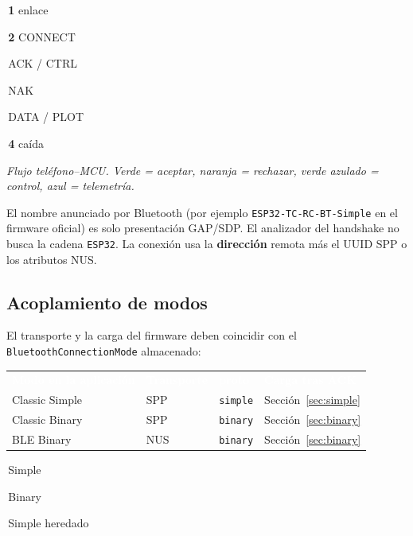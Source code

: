 \documentclass[12pt,a4paper]{article}
\newcommand{\thc}[1]{\textcolor{white}{\bfseries #1}}
\newcommand{\chip}[2]{\colorbox{#1}{\strut\,\scriptsize #2\,}}
\begin{document}
\begin{center}

\vspace{0.3em}
{\sffamily\scriptsize
\chip{TblHead!18}{\textcolor{TblHead}{\textbf{1} enlace}}
\chip{TblSync}{\textbf{2} CONNECT}
\chip{TblChan}{ACK / CTRL}
\chip{TblId}{NAK}
\chip{TblTelem}{DATA / PLOT}
\chip{TblSum}{\textbf{4} ca\'ida}}

\vspace{0.15em}
{\sffamily\scriptsize\itshape
Flujo tel\'efono--MCU. Verde = aceptar, naranja = rechazar, verde azulado = control, azul = telemetr\'ia.}
\end{center}

El nombre anunciado por Bluetooth (por ejemplo
\texttt{ESP32-TC-RC-BT-Simple} en el firmware oficial) es solo presentación
GAP/SDP.
El analizador del handshake no busca la cadena \texttt{ESP32}.
La conexión usa la \textbf{dirección} remota más el UUID SPP o los
atributos NUS.

\subsection{Acoplamiento de modos}

El transporte y la carga del firmware deben coincidir con el
\texttt{BluetoothConnectionMode} almacenado:

\begin{center}
\renewcommand{\arraystretch}{1.25}
\begin{tabular}{>{\raggedright\arraybackslash}p{3.5cm}
                >{\centering\arraybackslash}p{2.3cm}
                >{\centering\arraybackslash}p{1.8cm}
                >{\raggedright\arraybackslash}p{3.8cm}}
\rowcolor{TblHead}
\thc{Modo en la aplicación} & \thc{Transporte} & \thc{proto} & \thc{Carga tras ACK} \\
\rowcolor{TblChan}
Classic Simple & SPP & \texttt{simple} & Sección~\ref{sec:simple} \\
\rowcolor{TblTelem}
Classic Binary & SPP & \texttt{binary} & Sección~\ref{sec:binary} \\
\rowcolor{TblTelem}
BLE Binary & NUS & \texttt{binary} & Sección~\ref{sec:binary} \\
\end{tabular}

\vspace{0.4em}
\chip{TblChan}{Simple}
\chip{TblTelem}{Binary}
\chip{TblId}{Simple heredado}
\end{center}
\end{document}
